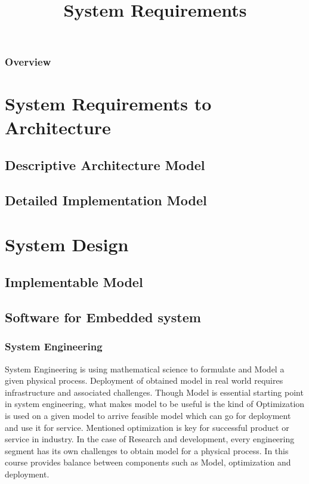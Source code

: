 
\title[Systems Engineering]{System Requirements } 

\begin{frame}
\frametitle{Overview} 
\end{frame}


\section{System Requirements to Architecture  } 

\subsection{Descriptive Architecture Model}

\subsection{Detailed Implementation  Model}

\section{ System  Design  }

\subsection{Implementable Model} 

\subsection{ Software for Embedded system} 


\begin{frame}
\frametitle{System Engineering }
System Engineering is using mathematical science to formulate and Model a given physical process.  Deployment of obtained model in real world requires infrastructure and associated challenges.  Though Model is essential starting point in system engineering, what makes model to be useful is the kind of Optimization is used on a given model to arrive feasible model which can go for deployment and use it for service.  Mentioned optimization is key for successful product or service in industry. In the case of Research and development, every engineering segment has its own challenges to obtain model for a physical process. In this course provides balance between components such as Model, optimization and deployment. 
\end{frame}

